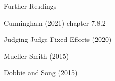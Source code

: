 \documentclass[notes,11pt, aspectratio=169]{beamer}
\newenvironment{wideitemize}{\itemize\addtolength{\itemsep}{10pt}}{\enditemize}
\begin{document}
\begin{frame}{Further Readings}
  \begin{wideitemize}
  \item Cunningham (2021) chapter 7.8.2
  \item Judging Judge Fixed Effects (2020)
  \item Mueller-Smith (2015)
  \item Dobbie and Song (2015)
  \end{wideitemize}
\end{frame}
\end{document}
